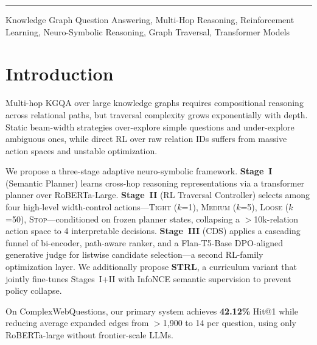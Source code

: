 \documentclass[10pt,conference]{IEEEtran}
\begin{document}
\vspace{4pt}\noindent\rule{\columnwidth}{0.4pt}\vspace{2pt}


\begin{IEEEkeywords}
Knowledge Graph Question Answering,
Multi-Hop Reasoning,
Reinforcement Learning,
Neuro-Symbolic Reasoning,
Graph Traversal,
Transformer Models
\end{IEEEkeywords}


\section{Introduction}



Multi-hop KGQA over large knowledge graphs requires compositional reasoning across relational paths, but traversal complexity grows exponentially with depth. Static beam-width strategies over-explore simple questions and under-explore ambiguous ones, while direct RL over raw relation IDs suffers from massive action spaces and unstable optimization.

We propose a three-stage adaptive neuro-symbolic framework. \textbf{Stage~I} (Semantic Planner) learns cross-hop reasoning representations via a transformer planner over RoBERTa-Large. \textbf{Stage~II} (RL Traversal Controller) selects among four high-level width-control actions—\textsc{Tight} ($k$=1), \textsc{Medium} ($k$=5), \textsc{Loose} ($k$=50), \textsc{Stop}—conditioned on frozen planner states, collapsing a $>$10k-relation action space to 4 interpretable decisions. \textbf{Stage~III} (CDS) applies a cascading funnel of bi-encoder, path-aware ranker, and a Flan-T5-Base DPO-aligned generative judge for listwise candidate selection—a second RL-family optimization layer. We additionally propose \textbf{STRL}, a curriculum variant that jointly fine-tunes Stages~I+II with InfoNCE semantic supervision to prevent policy collapse.

On ComplexWebQuestions, our primary system achieves \textbf{42.12\%} Hit@1 while reducing average expanded edges from $>$1,900 to 14 per question, using only RoBERTa-large without frontier-scale LLMs.
\end{document}

